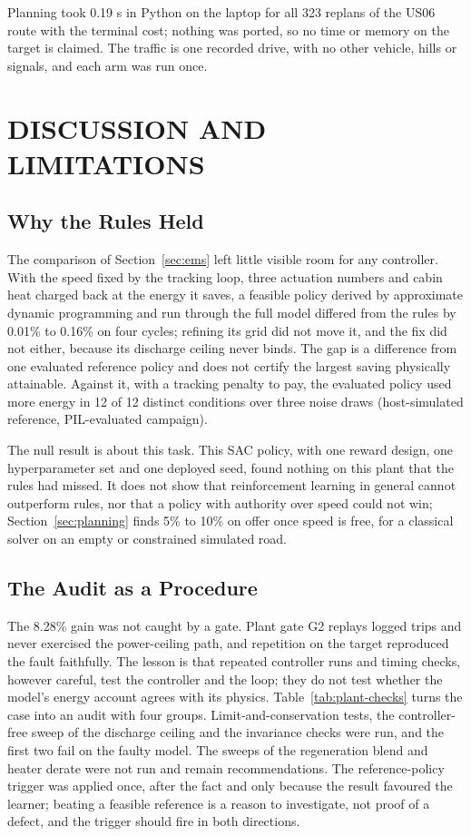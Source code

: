 \documentclass{ieeeaccess}
\begin{document}
Planning took 0.19 s in Python on the laptop for all 323 replans of the US06 route with the terminal cost; nothing was ported, so no time or memory on the target is claimed. The traffic is one recorded drive, with no other vehicle, hills or signals, and each arm was run once.

\section{DISCUSSION AND LIMITATIONS}
\label{sec:discussion}

\subsection{Why the Rules Held}

The comparison of Section~\ref{sec:ems} left little visible room for any controller. With the speed fixed by the tracking loop, three actuation numbers and cabin heat charged back at the energy it saves, a feasible policy derived by approximate dynamic programming and run through the full model differed from the rules by 0.01\% to 0.16\% on four cycles; refining its grid did not move it, and the fix did not either, because its discharge ceiling never binds. The gap is a difference from one evaluated reference policy and does not certify the largest saving physically attainable. Against it, with a tracking penalty to pay, the evaluated policy used more energy in 12 of 12 distinct conditions over three noise draws (host-simulated reference, PIL-evaluated campaign).

The null result is about this task. This SAC policy, with one reward design, one hyperparameter set and one deployed seed, found nothing on this plant that the rules had missed. It does not show that reinforcement learning in general cannot outperform rules, nor that a policy with authority over speed could not win; Section~\ref{sec:planning} finds 5\% to 10\% on offer once speed is free, for a classical solver on an empty or constrained simulated road.

\subsection{The Audit as a Procedure}

The 8.28\% gain was not caught by a gate. Plant gate G2 replays logged trips and never exercised the power-ceiling path, and repetition on the target reproduced the fault faithfully. The lesson is that repeated controller runs and timing checks, however careful, test the controller and the loop; they do not test whether the model's energy account agrees with its physics. Table~\ref{tab:plant-checks} turns the case into an audit with four groups. Limit-and-conservation tests, the controller-free sweep of the discharge ceiling and the invariance checks were run, and the first two fail on the faulty model. The sweeps of the regeneration blend and heater derate were not run and remain recommendations. The reference-policy trigger was applied once, after the fact and only because the result favoured the learner; beating a feasible reference is a reason to investigate, not proof of a defect, and the trigger should fire in both directions.
\end{document}
